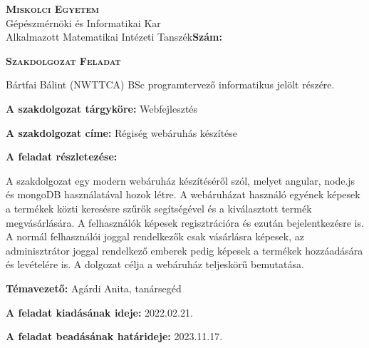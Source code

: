 \noindent
\textsc{\textbf{Miskolci Egyetem}}\\
Gépészmérnöki és Informatikai Kar\\
Alkalmazott Matematikai Intézeti Tanszék\hspace*{4cm}\hfil \textbf{Szám:}

\vspace{0.5cm}
\begin{center}
\large\textsc{\textbf{Szakdolgozat Feladat}}
\end{center}
\vspace{0.5cm}

Bártfai Bálint (NWTTCA) BSc programtervező informatikus jelölt részére.

\bigskip
\noindent\textbf{A szakdolgozat tárgyköre:} Webfejlesztés

\bigskip
\noindent\textbf{A szakdolgozat címe:} Régiség webáruhás készítése

\bigskip
\noindent\textbf{A feladat részletezése:}

\medskip

A szakdolgozat egy modern webáruház készítéséről szól, melyet angular, node.js és mongoDB használatával hozok létre. A webáruházat használó egyének képesek a termékek közti keresésre szűrők segítségével és a kiválasztott termék megvásárlására. A felhasználók képesek regisztrációra és ezután bejelentkezésre is. A normál felhasználói joggal rendelkezők csak vásárlásra képesek, az adminisztrátor joggal rendelkező emberek pedig képesek a termékek hozzáadására és levételére is. A dolgozat célja a webáruház teljeskörű bemutatása.

\medskip


\vfill

\noindent\textbf{Témavezető:} Agárdi Anita, tanársegéd


\bigskip
\noindent\textbf{A feladat kiadásának ideje:} 2022.02.21.

\noindent\textbf{A feladat beadásának határideje:} 2023.11.17.

\vspace{1.5cm}

\hfill\makebox[6cm]{\dotfill}

\hfill{}

\clearpage

